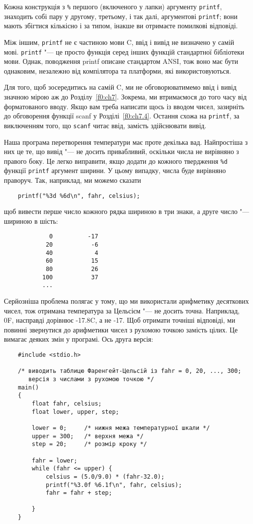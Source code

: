 \documentclass[a4paper,12pt]{book}
\begin{document}
  Кожна конструкція з \texttt{\%} першого (включеного у лапки) аргументу \texttt{printf},
  знаходить собі пару у другому, третьому, і так далі, аргументові \texttt{printf}; вони
  мають збігтися кількісно і за типом, інакше ви отримаєте помилкові відповіді.

  Між іншим, \texttt{printf} не є частиною мови C, ввід і вивід не визначено у самій мові.
  \texttt{printf} "--- це просто функція серед інших функцій стандартної бібліотеки
  мови. Однак, поводження printf описане стандартом ANSI, тож воно має бути однаковим,
  незалежно від компілятора та платформи, які використовуються.

  Для того, щоб зосередитись на самій C, ми не обговорюватимемо ввід і вивід значною мірою
  аж до Розділу~\ref{f0:ch7}. Зокрема, ми втримаємося до того часу від форматованого
  вводу. Якщо вам треба написати щось із вводом чисел, зазирніть до обговорення функції
  scanf у Розділі~\ref{f0:ch7.4}. Остання схожа на \texttt{printf}, за виключенням того,
  що \texttt{scanf} читає ввід, замість здійснювати вивід.

  Наша програма перетворення температури має проте декілька вад. Найпростіша з них це те,
  що вивід "--- не досить привабливий, оскільки числа не вирівняно з правого боку. Це
  легко виправити, якщо додати до кожного твердження \texttt{\%d} функції \texttt{printf}
  аргумент ширини. У цьому випадку, числа буде вирівняно праворуч. Так, наприклад, ми
  можемо сказати
  \begin{verbatim}
    printf("%3d %6d\n", fahr, celsius);
  \end{verbatim}
  щоб вивести перше число кожного рядка шириною в три знаки, а друге число "--- шириною в
  шість:
  \begin{verbatim}
             0          -17
            20           -6
            40            4
            60           15
            80           26
           100           37
           ...
  \end{verbatim}

  Серйозніша проблема полягає у тому, що ми використали арифметику десяткових чисел,
  тож отримана температура за Цельсієм "--- не досить точна. Наприклад, 0F, насправді
  дорівнює -17.8C, а не -17. Щоб отримати точніші відповіді, ми повинні звернутися до
  арифметики чисел з рухомою точкою замість цілих. Це вимагає деяких змін у програмі. Ось
  друга версія:
  \begin{verbatim}
    #include <stdio.h>

    /* виводить таблицю Фаренгейт-Цельсій із fahr = 0, 20, ..., 300;
       версія з числами з рухомою точкою */
    main()
    {
        float fahr, celsius;
        float lower, upper, step;

        lower = 0;     /* нижня межа температурної шкали */
        upper = 300;   /* верхня межа */
        step = 20;     /* розмір кроку */

        fahr = lower;
        while (fahr <= upper) {
            celsius = (5.0/9.0) * (fahr-32.0);
            printf("%3.0f %6.1f\n", fahr, celsius);
            fahr = fahr + step;

        }
    }
  \end{verbatim}
\end{document}

